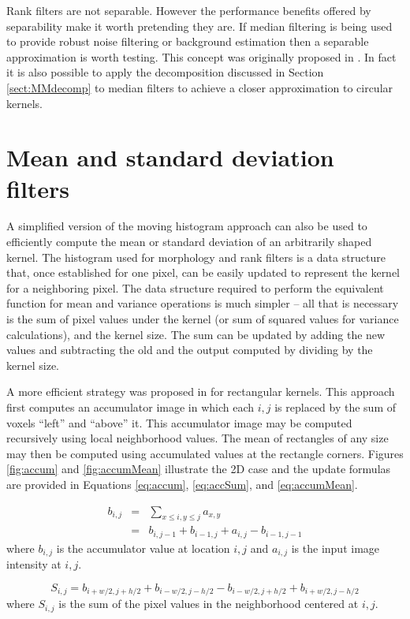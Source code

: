 \documentclass{InsightArticle}
\begin{document}
Rank filters are not separable. However the performance benefits
offered by separability make it worth pretending they are. If median
filtering is being used to provide robust noise filtering or
background estimation then a separable approximation is worth
testing. This concept was originally proposed in \cite{Narendra81}. In
fact it is also possible to apply the decomposition discussed in
Section \ref{sect:MMdecomp} to median filters to achieve a closer
approximation to circular kernels.

\section{Mean and standard deviation filters}
\label{sect:meanVar}
A simplified version of the moving histogram approach can also be used
to efficiently compute the mean or standard deviation of an arbitrarily shaped
kernel. The histogram used for morphology and rank filters is a data
structure that, once established for one pixel, can be easily updated
to represent the kernel for a neighboring pixel. The data structure
required to perform the equivalent function for mean and variance
operations is much simpler -- all that is necessary is the sum of
pixel values under the kernel (or sum of squared values for variance
calculations), and the kernel size. The sum can be updated by adding
the new values and subtracting the old and the output computed by
dividing by the kernel size.

A more efficient strategy was proposed in \cite{Crow84} for
rectangular kernels. This approach first computes an accumulator image
in which each $i,j$ is replaced by the sum of voxels ``left'' and
``above'' it. This accumulator image may be computed recursively using
local neighborhood values. The mean of rectangles of any size may then
be computed using accumulated values at the rectangle corners. Figures
\ref{fig:accum} and \ref{fig:accumMean} illustrate the 2D case and the
update formulas are provided in Equations \ref{eq:accum}, \ref{eq:accSum}, and
\ref{eq:accumMean}.

\begin{eqnarray}
\label{eq:accum}
b_{i,j} & = & \sum_{x \leq i, y \leq j} a_{x,y} \\ \nonumber
	& = & b_{i,j-1} + b_{i-1, j} + a_{i,j} - b_{i-1, j-1}
\end{eqnarray}
where $b_{i,j}$ is the accumulator value at location $i,j$ and $a_{i,j}$ is the input image intensity at $i,j$.

\begin{equation}
\label{eq:accSum}
S_{i,j} = b_{i+w/2,j+h/2} + b_{i-w/2,j-h/2} - b_{i-w/2,j+h/2} + b_{i+w/2,j-h/2}
\end{equation}
where $S_{i,j}$ is the sum of the pixel values in the neighborhood centered at $i,j$.
\end{document}
